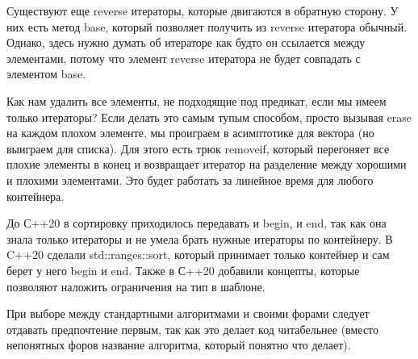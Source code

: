 \documentclass[12pt, a4paper]{article}
\begin{document}
	\par Существуют еще reverse итераторы, которые двигаются в обратную сторону. У них есть метод base, который позволяет получить из reverse итератора обычный. Однако, здесь нужно думать об итераторе как будто он ссылается между элементами, потому что элемент reverse итератора не будет совпадать с элементом base.
	\\\par Как нам удалить все элементы, не подходящие под предикат, если мы имеем только итераторы? Если делать это самым тупым способом, просто вызывая erase на каждом плохом элементе, мы проиграем в асимптотике для вектора (но выиграем для списка). Для этого есть трюк remove\textunderscore if, который перегоняет все плохие элементы в конец и возвращает итератор на разделение между хорошими и плохими элементами. Это будет работать за линейное время для любого контейнера.
	\\\par До С++20 в сортировку приходилось передавать и begin, и end, так как она знала только итераторы и не умела брать нужные итераторы по контейнеру. В C++20 сделали std::ranges::sort, который принимает только контейнер и сам берет у него begin и end. Также в С++20 добавили концепты, которые позволяют наложить ограничения на тип в шаблоне.
	\\\par При выборе между стандартными алгоритмами и своими форами следует отдавать предпочтение первым, так как это делает код читабельнее (вместо непонятных форов название алгоритма, который понятно что делает).
\end{document}
